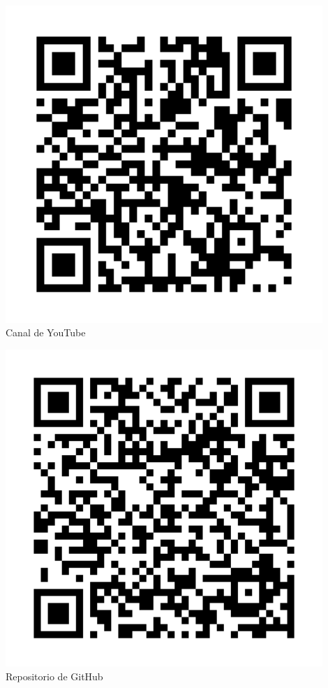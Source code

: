 \documentclass{book}
\begin{document}
\begin{titlepage}
\begin{minipage}{0.9\textwidth}
       
    \end{minipage}

    \vspace{1cm}
    \begin{minipage}{0.9\textwidth}
        \centering
        \begin{minipage}{0.45\textwidth}
            \centering
            \includegraphics[width=0.9\textwidth]{images/qr-youtube.png}\\
            \small Canal de YouTube
        \end{minipage}
        \hfill
        \begin{minipage}{0.45\textwidth}
            \centering
            \includegraphics[width=0.9\textwidth]{images/qr-github.png}\\
            \small Repositorio de GitHub
        \end{minipage}
    \end{minipage}


\end{titlepage}
\end{document}
